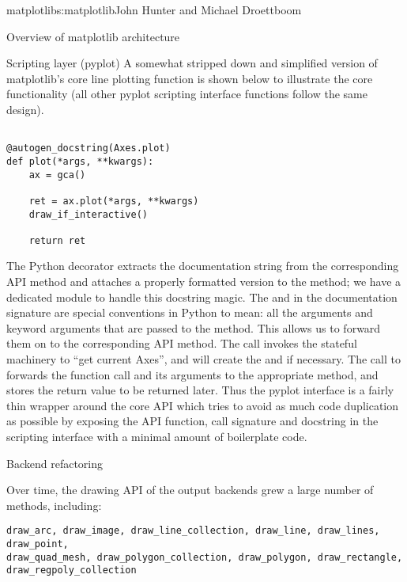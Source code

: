 \begin{aosachapter}{matplotlib}{s:matplotlib}{John Hunter and Michael Droettboom}
\begin{aosasect1}{Overview of matplotlib architecture}
\begin{aosasect2}{Scripting layer (pyplot)}
A somewhat stripped down and simplified version of matplotlib's core
line plotting function  is shown below to
illustrate the core functionality (all other pyplot scripting
interface functions follow the same design).

\begin{verbatim}

@autogen_docstring(Axes.plot)
def plot(*args, **kwargs):
    ax = gca()

    ret = ax.plot(*args, **kwargs)
    draw_if_interactive()

    return ret

\end{verbatim}

The Python decorator  extracts
the documentation string from the corresponding API method and
attaches a properly formatted version to the 
method; we have a dedicated module  to
handle this docstring magic.  The  and  in
the documentation signature are special conventions in Python to mean:
all the arguments and keyword arguments that are passed to the method.
This allows us to forward them on to the corresponding API method.
The call  invokes the stateful machinery to ``get
current Axes'', and will create the  and  if
necessary.  The call to  forwards
the function call and its arguments to the appropriate 
method, and stores the return value to be returned later.  Thus the
pyplot interface is a fairly thin wrapper around the core
 API which tries to avoid as much code duplication as
possible by exposing the API function, call signature and docstring in
the scripting interface with a minimal amount of boilerplate code.


\end{aosasect2}


\end{aosasect1}


\begin{aosasect1}{Backend refactoring}


Over time, the drawing API of the output backends grew a large number
of methods, including:

\begin{verbatim}
draw_arc, draw_image, draw_line_collection, draw_line, draw_lines, draw_point,
draw_quad_mesh, draw_polygon_collection, draw_polygon, draw_rectangle,
draw_regpoly_collection
\end{verbatim}


\end{aosasect1}
\end{aosachapter}
